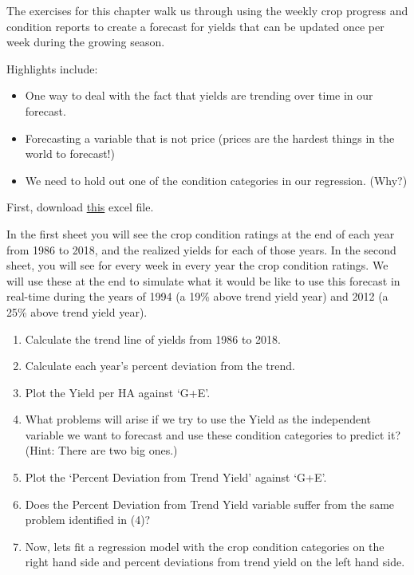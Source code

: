 \documentclass[
]{book}
\providecommand{\tightlist}{%
  \setlength{\itemsep}{0pt}\setlength{\parskip}{0pt}}
\begin{document}
The exercises for this chapter walk us through using the weekly crop progress and condition reports to create a forecast for yields that can be updated once per week during the growing season.

Highlights include:

\begin{itemize}
\tightlist
\item
  One way to deal with the fact that yields are trending over time in our forecast.
\item
  Forecasting a variable that is not price (prices are the hardest things in the world to forecast!)
\item
  We need to hold out one of the condition categories in our regression. (Why?)
\end{itemize}

First, download \href{Excel-files/yied-forecast-advanced.xlsx}{this} excel file.

In the first sheet you will see the crop condition ratings at the end of each year from 1986 to 2018, and the realized yields for each of those years. In the second sheet, you will see for every week in every year the crop condition ratings. We will use these at the end to simulate what it would be like to use this forecast in real-time during the years of 1994 (a 19\% above trend yield year) and 2012 (a 25\% above trend yield year).

\begin{enumerate}
\def\labelenumi{\arabic{enumi}.}
\tightlist
\item
  Calculate the trend line of yields from 1986 to 2018.
\item
  Calculate each year's percent deviation from the trend.
\item
  Plot the Yield per HA against `G+E'.
\item
  What problems will arise if we try to use the Yield as the independent variable we want to forecast and use these condition categories to predict it? (Hint: There are two big ones.)
\item
  Plot the `Percent Deviation from Trend Yield' against `G+E'.
\item
  Does the Percent Deviation from Trend Yield variable suffer from the same problem identified in (4)?
\item
  Now, lets fit a regression model with the crop condition categories on the right hand side and percent deviations from trend yield on the left hand side.
\end{enumerate}
\end{document}
